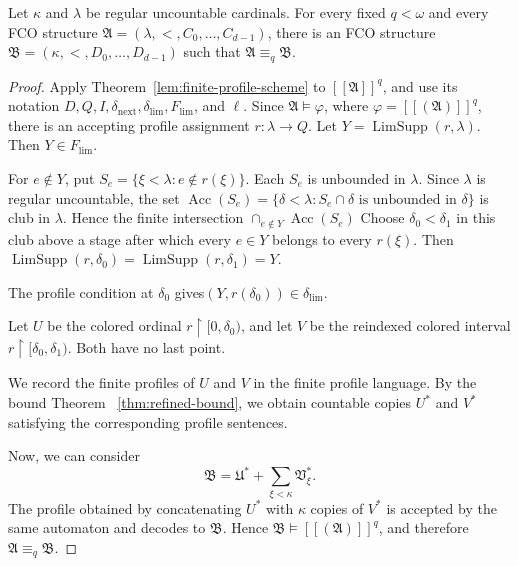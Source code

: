 \documentclass[10pt,a4paper]{amsart}
\begin{document}
\begin{theorem}\label{lem:exact-stretching}
    Let $\kappa$ and $\lambda$ be regular uncountable cardinals. For every fixed $q<\omega$ and every FCO structure $\mathfrak{A}=(\lambda,<,C_0,\dots,C_{d-1})$, there is an FCO structure $\mathfrak{B}=(\kappa,<,D_0,\dots,D_{d-1})$ such that $\mathfrak{A}\equiv_q\mathfrak{B}$.
\end{theorem}

\begin{proof}

Apply Theorem~\ref{lem:finite-profile-scheme} to $[[\mathfrak A]]^q$, and use its notation
$D,Q,I,\delta_{\mathrm{next}},\delta_{\mathrm{lim}},F_{\mathrm{lim}}$, and
$\ell$.  Since $\mathfrak A\models\varphi$, where $\varphi=[[(\mathfrak A)]]^q$, there is an accepting profile assignment $r\colon\lambda\to Q$.
Let
$
Y=\operatorname{LimSupp}(r,\lambda).
$
Then $Y\in F_{\mathrm{lim}}$.

 For $e\notin Y$, put $S_e=\{\xi<\lambda:e\notin r(\xi)\}.$
Each $S_e$ is unbounded in $\lambda$.  Since $\lambda$ is regular
uncountable, the set
$
  \operatorname{Acc}(S_e)=
  \{\delta<\lambda:S_e\cap\delta\text{ is unbounded in }\delta\}$
  is club in $\lambda$.  Hence the finite intersection
   $\cap_{e\notin Y}\operatorname{Acc}(S_e)$
Choose $\delta_0<\delta_1$ in this club above a stage after which every $e\in Y$ belongs to every $r(\xi)$. Then
$
  \operatorname{LimSupp}(r,\delta_0)=
  \operatorname{LimSupp}(r,\delta_1)=Y.
 $

The profile
condition at $\delta_0$ gives$  (Y,r(\delta_0))\in\delta_{\mathrm{lim}}.$

Let $U$ be the colored ordinal
$r\mathbin{\upharpoonright}[0,\delta_0)$, and let $V$ be the reindexed
colored interval
$r\mathbin{\upharpoonright}[\delta_0,\delta_1)$.  Both
have no last point.

We record the finite profiles of $U$ and $V$ in the finite profile language. By the bound Theorem ~\ref{thm:refined-bound}, we obtain countable copies $U^*$ and $V^*$ satisfying the corresponding profile sentences.

Now, we can consider
\[
  \mathfrak B= \mathfrak U^*+\sum_{\xi<\kappa}\mathfrak V^*_{\xi}.
\]
The profile obtained by concatenating $U^*$ with $\kappa$ copies of $V^*$ is accepted by the same automaton and decodes to $\mathfrak B$. Hence $\mathfrak B\models[[(\mathfrak A)]]^q$, and therefore $\mathfrak A\equiv_q\mathfrak B$.

\end{proof}
\end{document}
